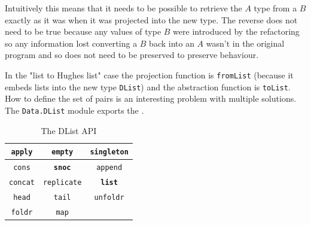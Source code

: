 Intuitively this means that it needs to be possible to retrieve the $A$ type from a $B$ exactly as it was when it was projected into the new type. The reverse does not need to be true because any values of type $B$ were introduced by the refactoring so any information lost converting a $B$ back into an $A$ wasn't in the original program and so does not need to be preserved to preserve behaviour.

In the "list to Hughes list" case the projection function is \texttt{fromList} (because it embeds lists into the new type \texttt{DList}) and the abstraction function is \texttt{toList}. How to define the set of pairs is an interesting problem with multiple solutions. The \texttt{Data.DList} module exports the  \DIFdelbegin {}\DIFdelend \DIFaddbegin {}\DIFaddend \citep{dlist}.


\begin{table}
\begin{center}
\begin{tabular}{| c | c | c |}
  \hline
  \texttt{apply} & \texttt{empty} & \texttt{singleton}\\
  \hline
  \texttt{cons} & \textbf{\texttt{snoc}} & \texttt{append} \\
  \hline
  \texttt{concat} & \texttt{replicate} & \textbf{\texttt{list}}\\ 
  \hline	
  \texttt{head} & \texttt{tail} & \texttt{unfoldr}\\ 
  \hline  
  \texttt{foldr} & \texttt{map} & \\
  \hline
\end{tabular}
\end{center}
\caption{The DList API}
\DIFaddbeginFL \label{dlistApi}
\DIFaddendFL \end{table}


